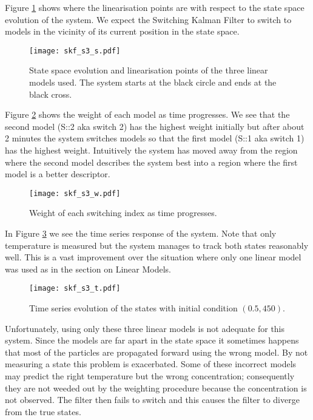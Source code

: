 Figure \ref{fig_3mod_ss} shows where the linearisation points are with respect to the state space evolution of the system. We expect the Switching Kalman Filter to switch to models in the vicinity of its current position in the state space.
\begin{figure}[H] 
\centering
\texttt{[image: skf\_s3\_s.pdf]}
\caption{State space evolution and linearisation points of the three linear models used. The system starts at the black circle and ends at the black cross.}
\label{fig_3mod_ss}
\end{figure}
Figure \ref{fig_3mod_w} shows the weight of each model as time progresses. We see that the second model (S::2 aka switch 2) has the highest weight initially but after about 2 minutes the system switches models so that the first model (S::1 aka switch 1) has the highest weight. Intuitively the system has moved away from the region where the second model describes the system best into a region where the first model is a better descriptor. 
\begin{figure}[H] 
\centering
\texttt{[image: skf\_s3\_w.pdf]}
\caption{Weight of each switching index as time progresses.}
\label{fig_3mod_w}
\end{figure}
In Figure \ref{fig_3mod_t} we see the time series response of the system. Note that only temperature is measured but the system manages to track both states reasonably well. This is a vast improvement over the situation where only one linear model was used as in the section on Linear Models.
\begin{figure}[H] 
\centering
\texttt{[image: skf\_s3\_t.pdf]}
\caption{Time series evolution of the states with initial condition $(0.5, 450)$.}
\label{fig_3mod_t}
\end{figure}
Unfortunately, using only these three linear models is not adequate for this system. Since the models are far apart in the state space it sometimes happens that most of the particles are propagated forward using the wrong model. By not measuring a state this problem is exacerbated. Some of these incorrect models may predict the right temperature but the wrong concentration; consequently they are not weeded out by the weighting procedure because the concentration is not observed. The filter then fails to switch and this causes the filter to diverge from the true states. 

